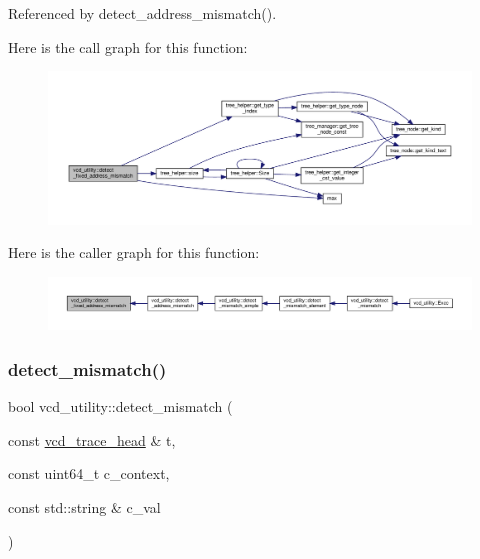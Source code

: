Referenced by detect\+\_\+address\+\_\+mismatch().

Here is the call graph for this function\+:
\nopagebreak
\begin{figure}[H]
\begin{center}
\leavevmode
\includegraphics[width=350pt]{d8/d51/classvcd__utility_adcea7de16b7dbf1c8b74aef06fc959a5_cgraph}
\end{center}
\end{figure}
Here is the caller graph for this function\+:
\nopagebreak
\begin{figure}[H]
\begin{center}
\leavevmode
\includegraphics[width=350pt]{d8/d51/classvcd__utility_adcea7de16b7dbf1c8b74aef06fc959a5_icgraph}
\end{center}
\end{figure}
\mbox{\label{classvcd__utility_a29d328311cf59d9e96c777dbd4c7734e}} 
\subsubsection{\texorpdfstring{detect\+\_\+mismatch()}{detect\_mismatch()}}
{\footnotesize\ttfamily bool vcd\+\_\+utility\+::detect\+\_\+mismatch (\begin{DoxyParamCaption}\item[{const \hyperlink{structvcd__trace__head}{vcd\+\_\+trace\+\_\+head} \&}]{t,  }\item[{const uint64\+\_\+t}]{c\+\_\+context,  }\item[{const std\+::string \&}]{c\+\_\+val }\end{DoxyParamCaption})\hspace{0.3cm}{\ttfamily [protected]}}



